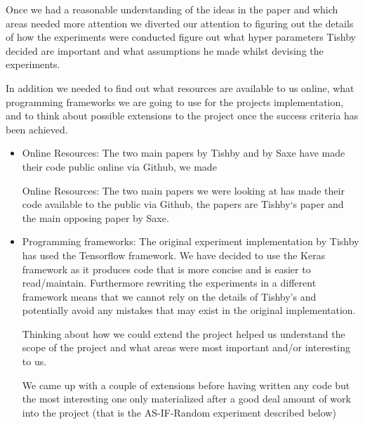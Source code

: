 Once we had a reasonable understanding of the ideas in the paper and which areas
needed more attention we diverted our attention to figuring out the details of
how the experiments were conducted figure out what hyper parameters Tishby
decided are important and what assumptions he made whilst devising the
experiments. 

In addition we needed to find out what resources are available to us online,
what programming frameworks we are going to use for the projects implementation,
and to think about possible extensions to the project once the success criteria
has been achieved.

\begin{itemize}
  \item{
      Online Resources: The two main papers by Tishby and by Saxe have made
      their code public online via Github, we made 

      Online Resources: The two main papers we were looking at has made their
      code available to the public via Github, the papers are Tishby`s paper and
      the main opposing paper by Saxe.
    }
  \item{
      Programming frameworks: The original experiment implementation by Tishby
      has used the Tensorflow framework. We have decided to use the Keras
      framework as it produces code that is more concise and is easier to
      read/maintain. Furthermore rewriting the experiments in a different
      framework means that we cannot rely on the details of Tishby's and
      potentially avoid any mistakes that may exist in the original
      implementation.
    }
    \begin{item}

      Thinking about how we could extend the project helped us understand the
      scope of the project and what areas were most important and/or interesting
      to us. 

      We came up with a couple of extensions before having written any code but
      the most interesting one only materialized after a good deal amount of
      work into the project (that is the AS-IF-Random experiment described
      below)


\end{item}
\end{itemize}

